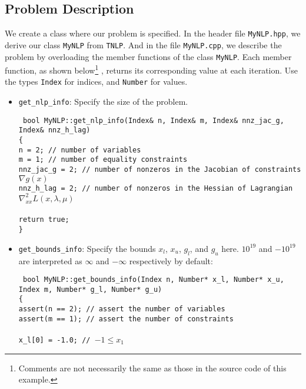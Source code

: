 \documentclass[letter,12pt]{article}
\begin{document}
\subsection{Problem Description}
We create a class where our problem is specified. In the header 
file {\tt MyNLP.hpp}, we
 derive our class {\tt MyNLP} from {\tt TNLP}. 
And in the file {\tt MyNLP.cpp}, we describe the problem by overloading the
 member functions of the class {\tt MyNLP}. Each member function, as
 shown below\footnote{Comments are
 not necessarily the same as those in the source code of this example.}
, returns
 its corresponding value at each iteration. Use the types {\tt Index}
 for indices, and {\tt Number} for values.\\
%
\begin{itemize}
\item{{\tt get\_nlp\_info}}: 
Specify the size of the problem.\\
\begin{small}
{\tt
bool MyNLP::get\_nlp\_info(Index\& n, Index\& m, Index\& nnz\_jac\_g, Index\& nnz\_h\_lag)\\
\{\\
  n = 2; // number of variables\\
  m = 1; // number of equality constraints\\
  nnz\_jac\_g = 2; // number of nonzeros in the Jacobian of constraints $\nabla g(x)$\\
  nnz\_h\_lag = 2; // number of nonzeros in the Hessian of Lagrangian $\nabla^2_{xx}L(x,\lambda,\mu)$\\
\\
  return true;\\
\}}
\end{small}
%
\item{{\tt get\_bounds\_info}}: 
Specify the bounds $x_l$, $x_u$, $g_l$, and $g_u$ here. $10^{19}$ and $-10^{19}$ are interpreted as
     $\infty$ and $-\infty$ respectively by default:\\
\begin{small}
{\tt
bool MyNLP::get\_bounds\_info(Index n, Number* x\_l, Number* x\_u,
			       Index m, Number* g\_l, Number* g\_u)\\
\{\\
  assert(n == 2); // assert the number of variables\\
  assert(m == 1); // assert the number of constraints\\
\\
  x\_l[0] = -1.0; // $-1 \leq x_1$\\
}
\end{small}
\end{itemize}
\end{document}

